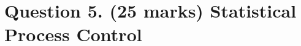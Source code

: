 \documentclass[a4paper,12pt]{article}
\begin{document}
%	
	

	
	

















\section*{Question 5. (25 marks) Statistical Process Control }
\end{document}
